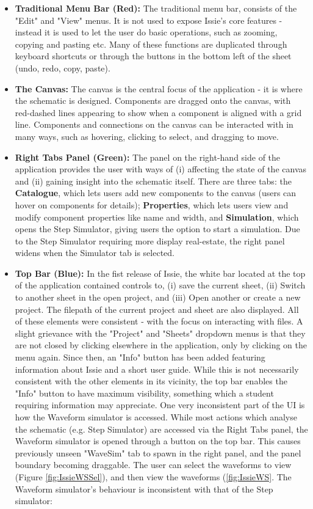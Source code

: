 \begin{itemize}
    \item[] \textbf{Traditional Menu Bar (Red):} The traditional menu bar, consists of the "Edit" and "View" menus. It is not used to expose Issie's core features - instead it is used to let the user do basic operations, such as zooming, copying and pasting etc. Many of these functions are duplicated through keyboard shortcuts or through the buttons in the bottom left of the sheet (undo, redo, copy, paste).
    \item[] \textbf{The Canvas:} The canvas is the central focus of the application - it is where the schematic is designed. Components are dragged onto the canvas, with red-dashed lines appearing to show when a component is aligned with a grid line. Components and connections on the canvas can be interacted with in many ways, such as hovering, clicking to select, and dragging to move.
    \item[] \textbf{Right Tabs Panel (Green):} The panel on the right-hand side of the application provides the user with ways of (i) affecting the state of the canvas and (ii) gaining insight into the schematic itself. There are three tabs: the \textbf{Catalogue}, which lets users add new components to the canvas (users can hover on components for details); \textbf{Properties}, which lets users view and modify component properties like name and width, and \textbf{Simulation}, which opens the Step Simulator, giving users the option to start a simulation. Due to the Step Simulator requiring more display real-estate, the right panel widens when the Simulator tab is selected.
    \item[] \textbf{Top Bar (Blue):} In the fist release of Issie, the white bar located at the top of the  application contained controls to, (i) save the current sheet, (ii) Switch to another sheet in the open project, and (iii) Open another or create a new project. The filepath of the current project and sheet are also displayed. All of these elements were consistent - with the focus on interacting with files. A slight grievance with the "Project" and "Sheets" dropdown menus is that they are not closed by clicking elsewhere in the application, only by clicking on the menu again. Since then, an "Info" button has been added featuring information about Issie and a short user guide. While this is not necessarily consistent with the other elements in its vicinity, the top bar enables the "Info" button to have maximum visibility, something which a student requiring information may appreciate. One very inconsistent part of the UI is how the Waveform simulator is accessed. While most actions which analyse the schematic (e.g. Step Simulator) are accessed via the Right Tabs panel, the Waveform simulator is opened through a button on the top bar. This causes previously unseen "WaveSim" tab to spawn in the right panel, and the panel boundary becoming draggable. The user can select the waveforms to view (Figure \ref{fig:IssieWSSel}), and then view the waveforms (\ref{fig:IssieWS}. The Waveform simulator's behaviour is inconsistent with that of the Step simulator:

\end{itemize}
